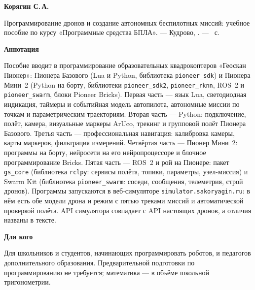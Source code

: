 \pagestyle{empty}
\sffamily
\setlength{\parindent}{0pt}
\vspace*{\fill}

{\large\bfseries\color{GeoskanDarkBlue} Корягин С.\,А.}\par
\vspace{4pt}
{\color{GeoskanDarkBlue} Программирование дронов и создание автономных беспилотных миссий: учебное пособие по курсу «Программные средства БПЛА». --- Кудрово, \the\year. --- \pageref{LastPage}~с.}\par
\vspace{1cm}

{\bfseries\color{GeoskanDarkBlue} Аннотация}\par
\vspace{4pt}
Пособие вводит в программирование образовательных квадрокоптеров «Геоскан Пионер»: Пионера Базового (Lua и Python, библиотека \texttt{pioneer\_sdk}) и Пионера Мини~2 (Python на борту, библиотеки \texttt{pioneer\_sdk2}, \texttt{pioneer\_rknn}, ROS~2 и \texttt{pioneer\_swarm}, блоки Pioneer Bricks). Первая часть --- язык Lua, светодиодная индикация, таймеры и событийная модель автопилота, автономные миссии по точкам и параметрическим траекториям. Вторая часть --- Python: подключение, полёт, камера, визуальные маркеры ArUco, трекинг и групповой полёт Пионера Базового. Третья часть --- профессиональная навигация: калибровка камеры, карты маркеров, фильтрация измерений. Четвёртая часть --- Пионер Мини~2: программы на борту, нейросети на его нейропроцессоре и блочное программирование Bricks. Пятая часть --- ROS~2 и рой на Пионере: пакет \texttt{gs\_core} (библиотека \texttt{rclpy}: сервисы полёта, топики, параметры, узел-миссия) и Swarm Kit (библиотека \texttt{pioneer\_swarm}: соседи, сообщения, телеметрия, строй дронов). Программы запускаются в веб-симуляторе \texttt{simulator.sakoryagin.ru}: в нём есть обе модели дрона и режим  с пятью треками миссий и автоматической проверкой полёта. API симулятора совпадает с API настоящих дронов, а отличия названы в тексте.\par
\vspace{0.8cm}

{\bfseries\color{GeoskanDarkBlue} Для кого}\par
\vspace{4pt}
Для школьников и студентов, начинающих программировать роботов, и педагогов дополнительного образования. Предварительной подготовки по программированию не требуется; математика --- в объёме школьной тригонометрии.\par
\vspace{0.8cm}

